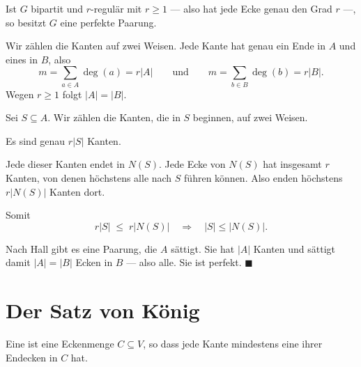 \begin{merksatz}
Ist $G$ bipartit und $r$-regulär mit $r \ge 1$ --- also hat jede Ecke genau den Grad $r$ ---, so besitzt $G$ eine perfekte Paarung.

Wir zählen die Kanten auf zwei Weisen. Jede Kante hat genau ein Ende in $A$ und eines in $B$, also
\[ m = \sum_{a \in A}\deg(a) = r|A| \qquad \text{und} \qquad m = \sum_{b \in B}\deg(b) = r|B| . \]
Wegen $r \ge 1$ folgt $|A| = |B|$.

Sei $S \subseteq A$. Wir zählen die Kanten, die in $S$ beginnen, auf zwei Weisen.

 Es sind genau $r|S|$ Kanten.

 Jede dieser Kanten endet in $N(S)$. Jede Ecke von $N(S)$ hat insgesamt $r$ Kanten, von denen höchstens alle nach $S$ führen können. Also enden höchstens $r|N(S)|$ Kanten dort.

Somit
\[ r|S| \;\le\; r|N(S)| \quad\Longrightarrow\quad |S| \le |N(S)| . \]

Nach Hall gibt es eine Paarung, die $A$ sättigt. Sie hat $|A|$ Kanten und sättigt damit $|A| = |B|$ Ecken in $B$ --- also alle. Sie ist perfekt. $\blacksquare$

\begin{center}
\begin{minipage}{0.88\textwidth}
\end{minipage}
\end{center}
\end{merksatz}

\section{Der Satz von König}

\begin{definition}
Eine  ist eine Eckenmenge $C \subseteq V$, so dass jede Kante mindestens eine ihrer Endecken in $C$ hat.
\end{definition}

